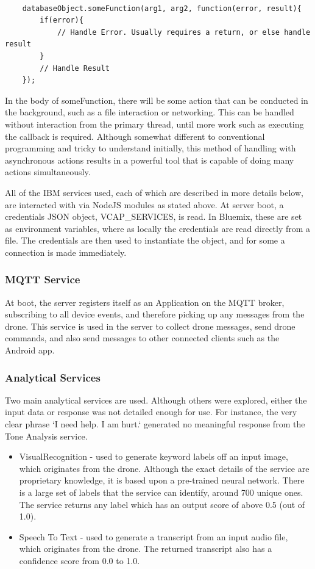 \documentclass{article}
\begin{document}
\begin{lstlisting}

	databaseObject.someFunction(arg1, arg2, function(error, result){
		if(error){
			// Handle Error. Usually requires a return, or else handle result
		}
		// Handle Result
	});

\end{lstlisting}  

In the body of someFunction, there will be some action that can be conducted in the background, such as a file interaction or networking. This can be handled without interaction from the primary thread, until more work such as executing the callback is required. Although somewhat different to conventional programming and tricky to understand initially, this method of handling with asynchronous actions results in a powerful tool that is capable of doing many actions simultaneously. 

All of the IBM services used, each of which are described in more details below, are interacted with via NodeJS modules as stated above. At server boot, a credentials JSON object, VCAP\_SERVICES, is read. In Bluemix, these are set as environment variables, where as locally the credentials are read directly from a file. The credentials are then used to instantiate the object, and for some a connection is made immediately.

\subsubsection{MQTT Service}
At boot, the server registers itself as an Application on the MQTT broker, subscribing to all device events, and therefore picking up any messages from the drone. This service is used in the server to collect drone messages, send drone commands, and also send messages to other connected clients such as the Android app.

\subsubsection{Analytical Services}\label{AnalyticalServices}
Two main analytical services are used. Although others were explored, either the input data or response was not detailed enough for use. For instance, the very clear phrase `I need help. I am hurt.` generated no meaningful response from the Tone Analysis service. 
\begin{itemize}
	\item VisualRecognition - used to generate keyword labels off an input image, which originates from the drone. Although the exact details of the service are proprietary knowledge, it is based upon a pre-trained neural network. There is a large set of labels that the service can identify, around 700 unique ones. The service returns any label which has an output score of above 0.5 (out of 1.0). 
	\item Speech To Text - used to generate a transcript from an input audio file, which originates from the drone. The returned transcript also has a confidence score from 0.0 to 1.0. 
\end{itemize}
\end{document}
